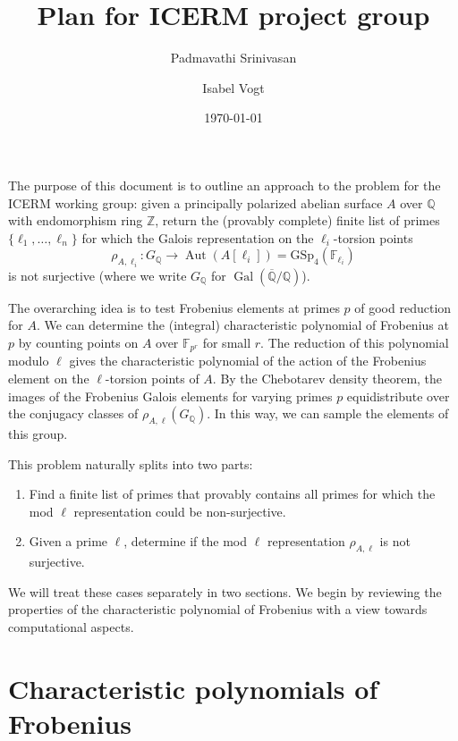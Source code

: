 \documentclass[11pt]{amsart}
\title{Plan for ICERM project group}
\author{Padmavathi Srinivasan}
\author{Isabel Vogt}
\date{\today}
\newcommand{\qq}{\mathbb{Q}}
\newcommand{\zz}{\mathbb{Z}}
\newcommand{\ff}{\mathbb{F}}
\newcommand{\GSp}{\text{GSp}}
\newcommand{\Gal}{\operatorname{Gal}}
\newcommand{\Aut}{\operatorname{Aut}}
\renewcommand{\bar}{\overline}
\theoremstyle{definition}
\theoremstyle{remark}
\begin{document}
\maketitle

The purpose of this document is to outline an approach to the problem for the ICERM working group: given a principally polarized abelian surface $A$ over $\qq$ with endomorphism ring $\zz$, return the (provably complete) finite list of primes $\{\ell_1, \dots, \ell_n\}$ for which the Galois representation on the $\ell_i$-torsion points
\[\rho_{A, \ell_i} \colon G_{\qq} \to \Aut\left(A[\ell_i]\right) = \GSp_{4}(\ff_{\ell_i}) \]
is not surjective (where we write $G_{\qq}$ for $\Gal\left(\bar{\qq}/\qq\right)$).  

The overarching idea is to test Frobenius elements at primes $p$ of good reduction for $A$.  We can determine the (integral) characteristic polynomial of Frobenius at $p$ by counting points on $A$ over $\ff_{p^r}$ for small $r$.    The reduction of this polynomial modulo $\ell$ gives the characteristic polynomial of the action of the Frobenius element on the $\ell$-torsion points of $A$.  By the Chebotarev density theorem, the images of the Frobenius Galois elements for varying primes $p$ equidistribute over the conjugacy classes of $\rho_{A, \ell}(G_{\qq})$.  In this way, we can sample the elements of this group.

This problem naturally splits into two parts:
\begin{enumerate}
\item Find a finite list of primes that provably contains all primes for which the mod $\ell$ representation could be non-surjective.
\item Given a prime $\ell$, determine if the mod $\ell$ representation $\rho_{A, \ell}$ is not surjective.
\end{enumerate}
We will treat these cases separately in two sections.  We begin by reviewing the properties of the characteristic polynomial of Frobenius with a view towards computational aspects.


\section{Characteristic polynomials of Frobenius}
\end{document}
